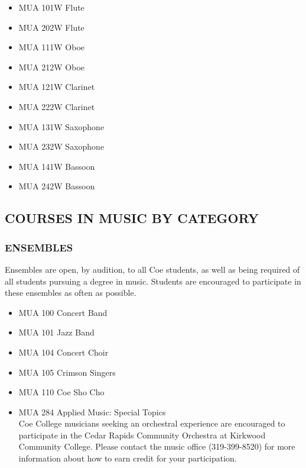 \documentclass[
  letterpaper,
]{scrbook}
\providecommand{\tightlist}{%
  \setlength{\itemsep}{0pt}\setlength{\parskip}{0pt}}
\begin{document}
\begin{itemize}
\tightlist
\item
  MUA 101W Flute\\
\item
  MUA 202W Flute\\
\item
  MUA 111W Oboe\\
\item
  MUA 212W Oboe\\
\item
  MUA 121W Clarinet\\
\item
  MUA 222W Clarinet\\
\item
  MUA 131W Saxophone\\
\item
  MUA 232W Saxophone\\
\item
  MUA 141W Bassoon\\
\item
  MUA 242W Bassoon
\end{itemize}

\subsection{COURSES IN MUSIC BY
CATEGORY}\label{courses-in-music-by-category}

\subsubsection{ENSEMBLES}\label{ensembles}

Ensembles are open, by audition, to all Coe students, as well as being
required of all students pursuing a degree in music. Students are
encouraged to participate in these ensembles as often as possible.

\begin{itemize}
\tightlist
\item
  MUA 100 Concert Band\\
\item
  MUA 101 Jazz Band\\
\item
  MUA 104 Concert Choir\\
\item
  MUA 105 Crimson Singers\\
\item
  MUA 110 Coe Sho Cho\\
\item
  MUA 284 Applied Music: Special Topics\\
  Coe College musicians seeking an orchestral experience are encouraged
  to participate in the Cedar Rapids Community Orchestra at Kirkwood
  Community College. Please contact the music office (319-399-8520) for
  more information about how to earn credit for your participation.
\end{itemize}
\end{document}
